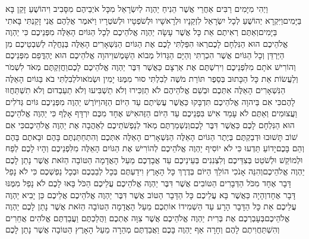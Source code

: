 \documentclass[../main/main.tex]{subfiles}
\begin{document}
\begin{multicols*}{\ncols}
וַיְהִי מִיָּמִים רַבִּים אַחֲרֵי אֲשֶׁר הֵנִיחַ יַהְוֶה לְיִשְׂרָאֵל מִכָּל אֹיְבֵיהֶם מִסָּבִיב וִיהוֹשֻׁעַ זָקֵן בָּא בַּיָּמִים\PreVerseSpace{}וַיִּקְרָא יְהוֹשֻׁעַ לְכָל יִשְׂרָאֵל לִזְקֵנָיו וּלְרָאשָׁיו וּלְשֹׁפְטָיו וּלְשֹׁטְרָיו וַיֹּאמֶר אֲלֵהֶם אֲנִי זָקַנְתִּי בָּאתִי בַּיָּמִים\PreVerseSpace{}וְאַתֶּם רְאִיתֶם אֵת כָּל אֲשֶׁר עָשָׂה יַהְוֶה אֱלֹהֵיכֶם לְכָל הַגּוֹיִם הָאֵלֶּה מִפְּנֵיכֶם כִּי יַהְוֶה אֱלֹהֵיכֶם הוּא הַנִּלְחָם לָכֶם\PreVerseSpace{}רְאוּ הִפַּלְתִּי לָכֶם אֶת הַגּוֹיִם הַנִּשְׁאָרִים הָאֵלֶּה בְּנַחֲלָה לְשִׁבְטֵיכֶם מִן הַיַּרְדֵּן וְכָל הַגּוֹיִם אֲשֶׁר הִכְרַתִּי וְהַיָּם הַגָּדוֹל מְבוֹא הַשָּׁמֶשׁ\PreVerseSpace{}וַיהוָה אֱלֹהֵיכֶם הוּא יֶהְדֳּפֵם מִפְּנֵיכֶם וְהוֹרִישׁ אֹתָם מִלִּפְנֵיכֶם וִירִשְׁתֶּם אֶת אַרְצָם כַּאֲשֶׁר דִּבֶּר יַהְוֶה אֱלֹהֵיכֶם לָכֶם\PreVerseSpace{}וַחֲזַקְתֶּם מְאֹד לִשְׁמֹר וְלַעֲשׂוֹת אֵת כָּל הַכָּתוּב בְּסֵפֶר תּוֹרַת מֹשֶׁה לְבִלְתִּי סוּר מִמֶּנּוּ יָמִין וּשְׂמֹאול\PreVerseSpace{}לְבִלְתִּי בֹא בַּגּוֹיִם הָאֵלֶּה הַנִּשְׁאָרִים הָאֵלֶּה אִתְּכֶם וּבְשֵׁם אֱלֹהֵיהֶם לֹא תַזְכִּירוּ וְלֹא תַשְׁבִּיעוּ וְלֹא תַעַבְדוּם וְלֹא תִשְׁתַּחֲווּ לָהֶם\PreVerseSpace{}כִּי אִם בַּיהוָה אֱלֹהֵיכֶם תִּדְבָּקוּ כַּאֲשֶׁר עֲשִׂיתֶם עַד הַיּוֹם הַזֶּה\PreVerseSpace{}וַיּוֹרֶשׁ יַהְוֶה מִפְּנֵיכֶם גּוֹיִם גְּדֹלִים וַעֲצוּמִים וְאַתֶּם לֹא עָמַד אִישׁ בִּפְנֵיכֶם עַד הַיּוֹם הַזֶּה\PreVerseSpace{}אִישׁ אֶחָד מִכֶּם יִרְדָּף אָלֶף כִּי יַהְוֶה אֱלֹהֵיכֶם הוּא הַנִּלְחָם לָכֶם כַּאֲשֶׁר דִּבֶּר לָכֶם\PreVerseSpace{}וְנִשְׁמַרְתֶּם מְאֹד לְנַפְשֹׁתֵיכֶם לְאַהֲבָה אֶת יַהְוֶה אֱלֹהֵיכֶם\PreVerseSpace{}כִּי אִם שׁוֹב תָּשׁוּבוּ וּדְבַקְתֶּם בְּיֶתֶר הַגּוֹיִם הָאֵלֶּה הַנִּשְׁאָרִים הָאֵלֶּה אִתְּכֶם וְהִתְחַתַּנְתֶּם בָּהֶם וּבָאתֶם בָּהֶם וְהֵם בָּכֶם\PreVerseSpace{}יָדוֹעַ תֵּדְעוּ כִּי לֹא יוֹסִיף יַהְוֶה אֱלֹהֵיכֶם לְהוֹרִישׁ אֶת הַגּוֹיִם הָאֵלֶּה מִלִּפְנֵיכֶם וְהָיוּ לָכֶם לְפַח וּלְמוֹקֵשׁ וּלְשֹׁטֵט בְּצִדֵּיכֶם וְלִצְנִנִים בְּעֵינֵיכֶם עַד אֲבָדְכֶם מֵעַל הָאֲדָמָה הַטּוֹבָה הַזֹּאת אֲשֶׁר נָתַן לָכֶם יַהְוֶה אֱלֹהֵיכֶם\PreVerseSpace{}וְהִנֵּה אָנֹכִי הוֹלֵךְ הַיּוֹם בְּדֶרֶךְ כָּל הָאָרֶץ וִידַעְתֶּם בְּכָל לְבַבְכֶם וּבְכָל נַפְשְׁכֶם כִּי לֹא נָפַל דָּבָר אֶחָד מִכֹּל הַדְּבָרִים הַטּוֹבִים אֲשֶׁר דִּבֶּר יַהְוֶה אֱלֹהֵיכֶם עֲלֵיכֶם הַכֹּל בָּאוּ לָכֶם לֹא נָפַל מִמֶּנּוּ דָּבָר אֶחָד\PreVerseSpace{}וְהָיָה כַּאֲשֶׁר בָּא עֲלֵיכֶם כָּל הַדָּבָר הַטּוֹב אֲשֶׁר דִּבֶּר יַהְוֶה אֱלֹהֵיכֶם אֲלֵיכֶם כֵּן יָבִיא יַהְוֶה עֲלֵיכֶם אֵת כָּל הַדָּבָר הָרָע עַד הַשְׁמִידוֹ אוֹתְכֶם מֵעַל הָאֲדָמָה הַטּוֹבָה הַזֹּאת אֲשֶׁר נָתַן לָכֶם יַהְוֶה אֱלֹהֵיכֶם\PreVerseSpace{}בְּעָבְרְכֶם אֶת בְּרִית יַהְוֶה אֱלֹהֵיכֶם אֲשֶׁר צִוָּה אֶתְכֶם וַהֲלַכְתֶּם וַעֲבַדְתֶּם אֱלֹהִים אֲחֵרִים וְהִשְׁתַּחֲוִיתֶם לָהֶם וְחָרָה אַף יַהְוֶה בָּכֶם וַאֲבַדְתֶּם מְהֵרָה מֵעַל הָאָרֶץ הַטּוֹבָה אֲשֶׁר נָתַן לָכֶם\OpenSection{}\par

\end{multicols*}
\end{document}

